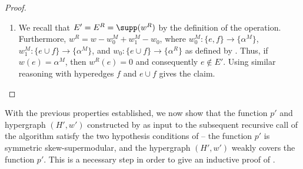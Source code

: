 \begin{proof}
\begin{enumerate}
     Then, we have the following: $$p(X) = b_{(H^M, w^M)}(X) = b_{(H,w)}(X) - \alpha^M \geq b_{(H,w)}(X) - \beta^M \geq b_{(H,w)}(X) - (b_{(H,w)}(X) - p(X)) = p(X).$$
    Thus, all inequalities are equations, and we have that $\alpha^M = \beta^M$.

    \item 
    We recall that $E' = E^R = \supp({w^R})$ by the definition of the \reduce operation. Furthermore, $w^R = w - w_0^M + w_1^M - w_0$, where $w_0^M:\{e, f\}\rightarrow\{\alpha^M\}$, $w_1^M:\{e\cup f\} \rightarrow\{\alpha^M\}$, and $w_0:\{e\cup f\}\rightarrow\{\alpha^R\}$ as defined by . Thus, if $w(e) = \alpha^M$, then $w^R(e) = 0$ and consequently $e \not \in E'$. Using similar reasoning with hyperedges $f$ and $e\cup f$ gives the claim.
    \fi
\end{enumerate}
\end{proof}

With the previous properties established, we now show that the function $p'$ and hypergraph $(H', w')$ constructed by   as input to the subsequent recursive call of the algorithm satisfy the two hypothesis conditions of   --  the function $p'$ is symmetric skew-supermodular, and the hypergraph $(H', w')$ weakly covers the function $p'$. This is a necessary step in order to give an inductive proof of . 

